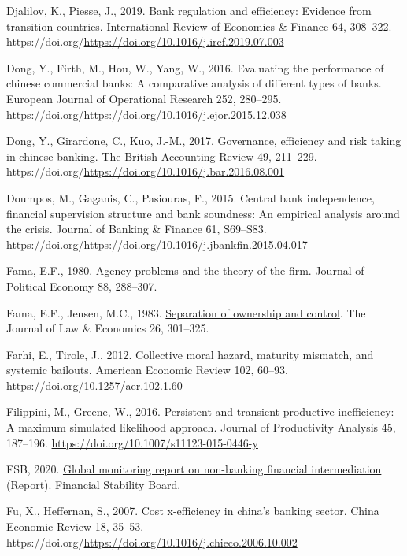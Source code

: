 \documentclass[
  letterpaper,
  DIV=11,
  numbers=noendperiod]{scrreprt}
\newlength{\cslhangindent}
\newenvironment{CSLReferences}[2] %
 {\begin{list}{}{%
  \setlength{\itemindent}{0pt}
  \setlength{\leftmargin}{0pt}
  \setlength{\parsep}{0pt}
  \ifodd #1
   \setlength{\leftmargin}{\cslhangindent}
   \setlength{\itemindent}{-1\cslhangindent}
  \fi
  \setlength{\itemsep}{#2\baselineskip}}}
 {\end{list}}
\begin{document}
\begin{CSLReferences}{1}{0}
Djalilov, K., Piesse, J., 2019. Bank regulation and efficiency: Evidence
from transition countries. International Review of Economics \& Finance
64, 308--322.
https://doi.org/\url{https://doi.org/10.1016/j.iref.2019.07.003}

Dong, Y., Firth, M., Hou, W., Yang, W., 2016. Evaluating the performance
of chinese commercial banks: A comparative analysis of different types
of banks. European Journal of Operational Research 252, 280--295.
https://doi.org/\url{https://doi.org/10.1016/j.ejor.2015.12.038}

Dong, Y., Girardone, C., Kuo, J.-M., 2017. Governance, efficiency and
risk taking in chinese banking. The British Accounting Review 49,
211--229.
https://doi.org/\url{https://doi.org/10.1016/j.bar.2016.08.001}

Doumpos, M., Gaganis, C., Pasiouras, F., 2015. Central bank
independence, financial supervision structure and bank soundness: An
empirical analysis around the crisis. Journal of Banking \& Finance 61,
S69--S83.
https://doi.org/\url{https://doi.org/10.1016/j.jbankfin.2015.04.017}

Fama, E.F., 1980. \href{http://www.jstor.org/stable/1837292}{Agency
problems and the theory of the firm}. Journal of Political Economy 88,
288--307.

Fama, E.F., Jensen, M.C., 1983.
\href{http://www.jstor.org/stable/725104}{Separation of ownership and
control}. The Journal of Law \& Economics 26, 301--325.

Farhi, E., Tirole, J., 2012. Collective moral hazard, maturity mismatch,
and systemic bailouts. American Economic Review 102, 60--93.
\url{https://doi.org/10.1257/aer.102.1.60}

Filippini, M., Greene, W., 2016. Persistent and transient productive
inefficiency: A maximum simulated likelihood approach. Journal of
Productivity Analysis 45, 187--196.
\url{https://doi.org/10.1007/s11123-015-0446-y}

FSB, 2020.
\href{https://www.fsb.org/wp-content/uploads/P161220.pdf}{Global
monitoring report on non-banking financial intermediation} (Report).
Financial Stability Board.

Fu, X., Heffernan, S., 2007. Cost x-efficiency in china's banking
sector. China Economic Review 18, 35--53.
https://doi.org/\url{https://doi.org/10.1016/j.chieco.2006.10.002}


\end{CSLReferences}
\end{document}
